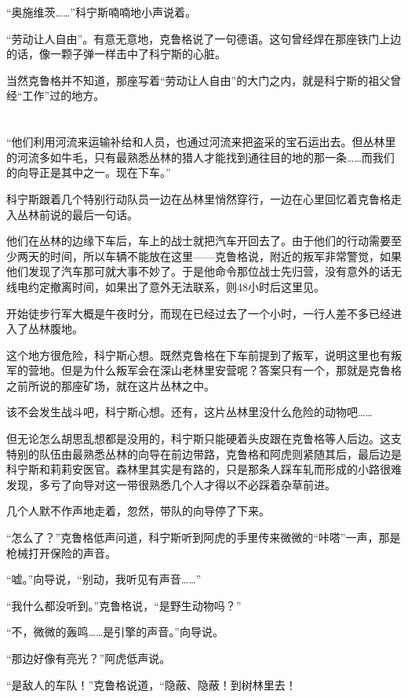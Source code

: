 “奥施维茨……”科宁斯喃喃地小声说着。

“劳动让人自由”。有意无意地，克鲁格说了一句德语。这句曾经焊在那座铁门上边的话，像一颗子弹一样击中了科宁斯的心脏。

当然克鲁格并不知道，那座写着“劳动让人自由”的大门之内，就是科宁斯的祖父曾经“工作”过的地方。

\section*{}

“他们利用河流来运输补给和人员，也通过河流来把盗采的宝石运出去。但丛林里的河流多如牛毛，只有最熟悉丛林的猎人才能找到通往目的地的那一条……而我们的向导正是其中之一。现在下车。”

科宁斯跟着几个特别行动队员一边在丛林里悄然穿行，一边在心里回忆着克鲁格走入丛林前说的最后一句话。

他们在丛林的边缘下车后，车上的战士就把汽车开回去了。由于他们的行动需要至少两天的时间，所以车辆不能放在这里——克鲁格说，附近的叛军非常警觉，如果他们发现了汽车那可就大事不妙了。于是他命令那位战士先归营，没有意外的话无线电约定撤离时间，如果出了意外无法联系，则48小时后这里见。

开始徒步行军大概是午夜时分，而现在已经过去了一个小时，一行人差不多已经进入了丛林腹地。

这个地方很危险，科宁斯心想。既然克鲁格在下车前提到了叛军，说明这里也有叛军的营地。但是为什么叛军会在深山老林里安营呢？答案只有一个，那就是克鲁格之前所说的那座矿场，就在这片丛林之中。

该不会发生战斗吧，科宁斯心想。还有，这片丛林里没什么危险的动物吧……

但无论怎么胡思乱想都是没用的，科宁斯只能硬着头皮跟在克鲁格等人后边。这支特别的队伍由最熟悉丛林的向导在前边带路，克鲁格和阿虎则紧随其后，最后边是科宁斯和莉莉安医官。森林里其实是有路的，只是那条人踩车轧而形成的小路很难发现，多亏了向导对这一带很熟悉几个人才得以不必踩着杂草前进。

几个人默不作声地走着，忽然，带队的向导停了下来。

“怎么了？”克鲁格低声问道，科宁斯听到阿虎的手里传来微微的“咔嗒”一声，那是枪械打开保险的声音。

“嘘。”向导说，“别动，我听见有声音……”

“我什么都没听到。”克鲁格说，“是野生动物吗？”

“不，微微的轰鸣……是引擎的声音。”向导说。

“那边好像有亮光？”阿虎低声说。

“是敌人的车队！”克鲁格说道，“隐蔽、隐蔽！到树林里去！ 

